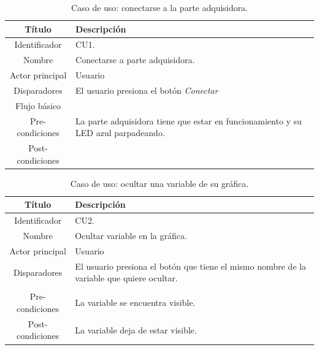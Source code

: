 \begin{table}[h]
	\centering
	\caption{Caso de uso: conectarse a la parte adquisidora.}
	\centering
	\begin{tabular}{c p{}}    
		\toprule
		\textbf{Título }     & \textbf{Descripción} \\
		\midrule
		Identificador		&  CU1. \\
		Nombre				&   Conectarse a parte adquisidora. \\
		Actor principal		&   Usuario \\
		Disparadores		&   El usuario presiona el botón \textit{Conectar} \\
		Flujo básico		&   \\
		Pre-condiciones		&   La parte adquisidora tiene que estar en funcionamiento y su LED azul parpadeando. \\
		Post-condiciones	&    \\
		\bottomrule
	\end{tabular}
\label{tab:caso-conectar}
\end{table}

\begin{table}[h]
	\centering
	\caption{Caso de uso: ocultar una variable de su gráfica.}
	\centering
	\begin{tabular}{c p{}}    
		\toprule
		\textbf{Título }     & \textbf{Descripción} \\
		\midrule
		Identificador		&  CU2. \\
		Nombre				&   Ocultar variable en la gráfica. \\
		Actor principal		&   Usuario \\
		Disparadores		&   El usuario presiona el botón que tiene el mismo nombre de la variable que quiere ocultar. \\
\\
		Pre-condiciones		&   La variable se encuentra visible. \\
		Post-condiciones	&   La variable deja de estar visible.\\
		\bottomrule
	\end{tabular}
\label{tab:caso-ocultar}
\end{table}


